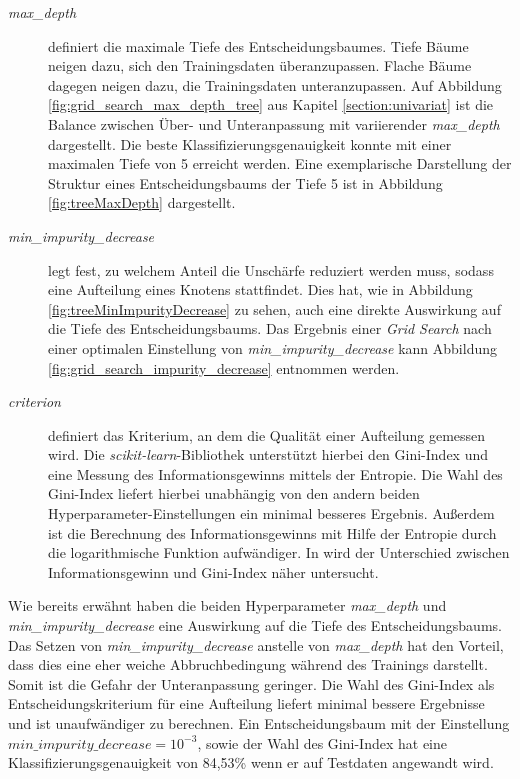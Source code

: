 \begin{description}
	\item[\emph{max\_depth}]
	 definiert die maximale Tiefe des Entscheidungsbaumes. Tiefe Bäume neigen dazu, sich den Trainingsdaten überanzupassen. Flache Bäume dagegen neigen dazu, die Trainingsdaten unteranzupassen. Auf Abbildung \ref{fig:grid_search_max_depth_tree} aus Kapitel \ref{section:univariat} ist die Balance zwischen Über- und Unteranpassung mit variierender \emph{max\_depth} dargestellt. Die beste Klassifizierungsgenauigkeit konnte mit einer maximalen Tiefe von 5 erreicht werden. Eine exemplarische Darstellung der Struktur eines Entscheidungsbaums der Tiefe 5 ist in Abbildung \ref{fig:treeMaxDepth} dargestellt.

	\item[\emph{min\_impurity\_decrease}] 
	legt fest, zu welchem Anteil die Unschärfe reduziert werden muss, sodass eine Aufteilung eines Knotens stattfindet. Dies hat, wie in Abbildung \ref{fig:treeMinImpurityDecrease} zu sehen, auch eine direkte Auswirkung auf die Tiefe des Entscheidungsbaums. Das Ergebnis einer \emph{Grid Search} nach einer optimalen Einstellung von \emph{min\_impurity\_decrease} kann Abbildung \ref{fig:grid_search_impurity_decrease} entnommen werden.
	
	\item[\emph{criterion}]
	definiert das Kriterium, an dem die Qualität einer Aufteilung gemessen wird. Die \emph{scikit-learn}-Bibliothek unterstützt hierbei den Gini-Index und eine Messung des Informationsgewinns mittels der Entropie. Die Wahl des Gini-Index liefert hierbei unabhängig von den andern beiden Hyperparameter-Einstellungen ein minimal besseres Ergebnis. Außerdem ist die Berechnung des Informationsgewinns mit Hilfe der Entropie durch die logarithmische Funktion aufwändiger. In \cite{gini_entropy} wird der Unterschied zwischen Informationsgewinn und Gini-Index näher untersucht.
\end{description}

Wie bereits erwähnt haben die beiden Hyperparameter \emph{max\_depth} und \emph{min\_impurity\_decrease} eine Auswirkung auf die Tiefe des Entscheidungsbaums. Das Setzen von \emph{min\_impurity\_decrease} anstelle von  \emph{max\_depth} hat den Vorteil, dass dies eine eher weiche Abbruchbedingung während des Trainings darstellt. Somit ist die Gefahr der Unteranpassung geringer. Die Wahl des Gini-Index als Entscheidungskriterium für eine Aufteilung liefert minimal bessere Ergebnisse und ist unaufwändiger zu berechnen. Ein Entscheidungsbaum mit der Einstellung $min\_impurity\_decrease = 10^{-3}$, sowie der Wahl des Gini-Index hat eine Klassifizierungsgenauigkeit von 84,53\% wenn er auf Testdaten angewandt wird.

